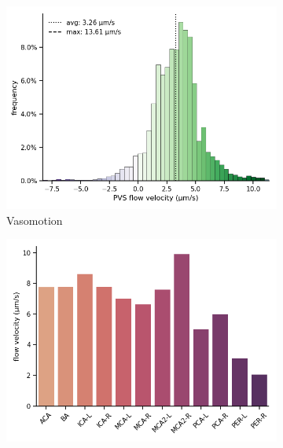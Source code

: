 \documentclass[fleqn,10pt]{wlscirep}
\begin{document}
\begin{figure}
\begin{subfigure}[b]{0.3\textwidth}
    \end{subfigure}
     \begin{subfigure}[b]{0.33\textwidth}
    \centering
    \includegraphics[width =  \linewidth]{figures/vasomotion_velocity_histo_cell.png}
    \caption{Vasomotion}
    \end{subfigure}
    \begin{subfigure}[b]{0.33\textwidth}
    \centering
    \includegraphics[width =  \linewidth]{figures/vasomotion_arteries_labels_velocity.png}
    \end{subfigure}
    \begin{subfigure}[b]{0.33\textwidth}
    \centering

\end{subfigure}
\end{figure}
\end{document}
